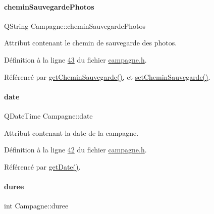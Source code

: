 \mbox{\label{class_campagne_a95484d0782021bc30157669d16c42208}} 
\paragraph{\texorpdfstring{chemin\+Sauvegarde\+Photos}{cheminSauvegardePhotos}}
{\footnotesize\ttfamily Q\+String Campagne\+::chemin\+Sauvegarde\+Photos\hspace{0.3cm}{\ttfamily [private]}}



Attribut contenant le chemin de sauvegarde des photos. 



Définition à la ligne \hyperlink{campagne_8h_source_l00043}{43} du fichier \hyperlink{campagne_8h_source}{campagne.\+h}.



Référencé par \hyperlink{campagne_8cpp_source_l00055}{get\+Chemin\+Sauvegarde()}, et \hyperlink{campagne_8cpp_source_l00060}{set\+Chemin\+Sauvegarde()}.

\mbox{\label{class_campagne_ac8180e3e533648770c4e6d9a182fe3ed}} 
\paragraph{\texorpdfstring{date}{date}}
{\footnotesize\ttfamily Q\+Date\+Time Campagne\+::date\hspace{0.3cm}{\ttfamily [private]}}



Attribut contenant la date de la campagne. 



Définition à la ligne \hyperlink{campagne_8h_source_l00042}{42} du fichier \hyperlink{campagne_8h_source}{campagne.\+h}.



Référencé par \hyperlink{campagne_8cpp_source_l00039}{get\+Date()}.

\mbox{\label{class_campagne_a4fb4cb286275103c9b6946e25e301fbf}} 
\paragraph{\texorpdfstring{duree}{duree}}
{\footnotesize\ttfamily int Campagne\+::duree\hspace{0.3cm}{\ttfamily [private]}}



